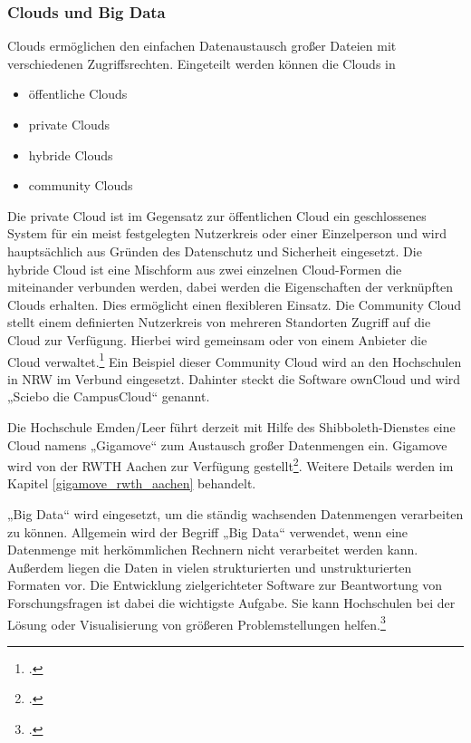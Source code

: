 \subsubsection{Clouds und Big Data}
Clouds ermöglichen den einfachen Datenaustausch großer Dateien mit verschiedenen Zugriffsrechten. Eingeteilt werden können die Clouds in

\begin{itemize}
	\item öffentliche Clouds
	\item private Clouds
	\item hybride Clouds
	\item community Clouds
\end{itemize}

Die private Cloud ist im Gegensatz zur öffentlichen Cloud ein geschlossenes System für ein meist festgelegten Nutzerkreis oder einer Einzelperson und wird hauptsächlich aus Gründen des Datenschutz und Sicherheit eingesetzt.
Die hybride Cloud ist eine Mischform aus zwei einzelnen Cloud-Formen die miteinander verbunden werden, dabei werden die Eigenschaften der verknüpften Clouds erhalten. Dies ermöglicht einen flexibleren Einsatz.
Die Community Cloud stellt einem definierten Nutzerkreis von mehreren Standorten Zugriff auf die Cloud zur Verfügung. Hierbei wird gemeinsam oder von einem Anbieter die Cloud verwaltet.\footcite[Vgl.][3]{nistpub_2011}
Ein Beispiel dieser Community Cloud wird an den Hochschulen in NRW im Verbund eingesetzt. Dahinter steckt die Software ownCloud und wird „Sciebo die CampusCloud“ genannt.

Die Hochschule Emden/Leer führt derzeit mit Hilfe des Shibboleth-Dienstes eine Cloud namens „Gigamove“ zum Austausch großer Datenmengen ein. Gigamove wird von der RWTH Aachen zur Verfügung gestellt\footcite{gigamove_rwth}. Weitere Details werden im Kapitel \ref{gigamove_rwth_aachen} behandelt.

„Big Data“ wird eingesetzt, um die ständig wachsenden Datenmengen verarbeiten zu können. Allgemein wird der Begriff „Big Data“ verwendet, wenn eine Datenmenge mit herkömmlichen Rechnern nicht verarbeitet werden kann. Außerdem liegen die Daten in vielen strukturierten und unstrukturierten Formaten vor. Die Entwicklung zielgerichteter Software zur Beantwortung von Forschungsfragen ist dabei die wichtigste Aufgabe. Sie kann Hochschulen bei der Lösung oder Visualisierung von größeren Problemstellungen helfen.\footcite[Vgl.][65]{keller_klein_tuschl_2015}


